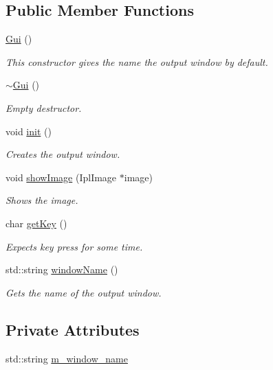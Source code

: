 \subsection*{Public Member Functions}
\begin{DoxyCompactItemize}
\item 
\hyperlink{classtld_1_1Gui_a3d8f787eff005a186184741e86de65b2}{Gui} ()
\begin{DoxyCompactList}\small\item\em This constructor gives the name the output window by default. \end{DoxyCompactList}\item 
\hyperlink{classtld_1_1Gui_ab918b39ef1ff13e7e6be76d521f9357f}{$\sim$\-Gui} ()
\begin{DoxyCompactList}\small\item\em Empty destructor. \end{DoxyCompactList}\item 
void \hyperlink{classtld_1_1Gui_aed1a0c246dfc3795560422ae762d58b3}{init} ()
\begin{DoxyCompactList}\small\item\em Creates the output window. \end{DoxyCompactList}\item 
void \hyperlink{classtld_1_1Gui_a639a48143e702f183fc4dd626b7900ae}{show\-Image} (Ipl\-Image $\ast$image)
\begin{DoxyCompactList}\small\item\em Shows the image. \end{DoxyCompactList}\item 
char \hyperlink{classtld_1_1Gui_a08a00ca08170f5707937aa133c12c415}{get\-Key} ()
\begin{DoxyCompactList}\small\item\em Expects key press for some time. \end{DoxyCompactList}\item 
std\-::string \hyperlink{classtld_1_1Gui_acc98f1b85990af20927cbf3e691a8f1a}{window\-Name} ()
\begin{DoxyCompactList}\small\item\em Gets the name of the output window. \end{DoxyCompactList}\end{DoxyCompactItemize}
\subsection*{Private Attributes}
\begin{DoxyCompactItemize}
\item 
std\-::string \hyperlink{classtld_1_1Gui_a23e2c6bb054fdde33571f9f22eb6c2d4}{m\-\_\-window\-\_\-name}
\end{DoxyCompactItemize}


